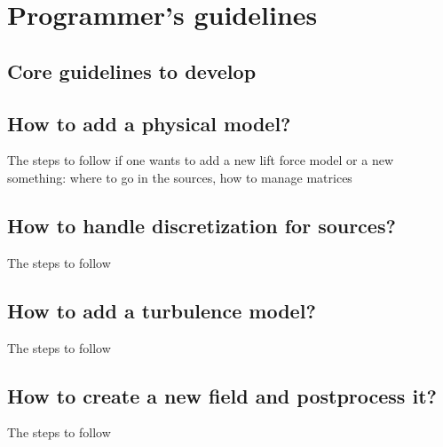 \chapter{Programmer's guidelines}
\section{Core guidelines to develop}
\section{How to add a physical model?}
The steps to follow if one wants to add a new lift force model or a new something: where to go in the sources, how to manage matrices
\section{How to handle discretization for sources?}
The steps to follow
\section{How to add a turbulence model?}
The steps to follow
\section{How to create a new field and postprocess it?}
The steps to follow